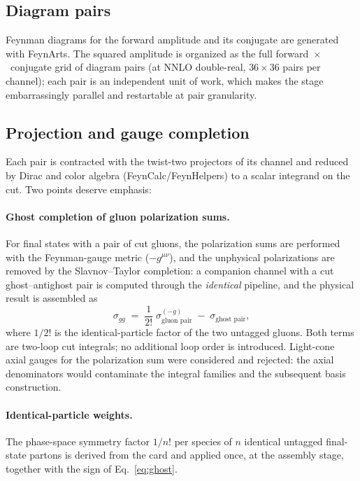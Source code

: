 \documentclass[11pt]{article}
\begin{document}
\subsection{Diagram pairs}

Feynman diagrams for the forward amplitude and its conjugate are
generated with \textsf{FeynArts}.  The squared amplitude is organized
as the full forward~$\times$~conjugate grid of diagram pairs (at NNLO
double-real, $36 \times 36$ pairs per channel); each pair is an
independent unit of work, which makes the stage embarrassingly
parallel and restartable at pair granularity.

\subsection{Projection and gauge completion}

Each pair is contracted with the twist-two projectors of its channel
and reduced by Dirac and color algebra
(\textsf{FeynCalc}/\textsf{FeynHelpers}) to a scalar integrand on the
cut.  Two points deserve emphasis:

\paragraph{Ghost completion of gluon polarization sums.}  For final
states with a pair of cut gluons, the polarization sums are performed
with the Feynman-gauge metric ($-g^{\mu\nu}$), and the unphysical
polarizations are removed by the Slavnov--Taylor completion: a
companion channel with a cut ghost--antighost pair is computed through
the \emph{identical} pipeline, and the physical result is assembled as
\begin{equation}
  \sigma_{gg}
  \;=\;
  \frac{1}{2!}\;\sigma^{(-g)}_{\text{gluon pair}}
  \;-\;
  \sigma_{\text{ghost pair}} ,
  \label{eq:ghost}
\end{equation}
where $1/2!$ is the identical-particle factor of the two untagged
gluons.  Both terms are two-loop cut integrals; no additional loop
order is introduced.  Light-cone axial gauges for the polarization sum
were considered and rejected: the axial denominators would contaminate
the integral families and the subsequent basis construction.

\paragraph{Identical-particle weights.}  The phase-space symmetry
factor $1/n!$ per species of $n$ identical untagged final-state
partons is derived from the card and applied once, at the assembly
stage, together with the sign of Eq.~\eqref{eq:ghost}.
\end{document}
